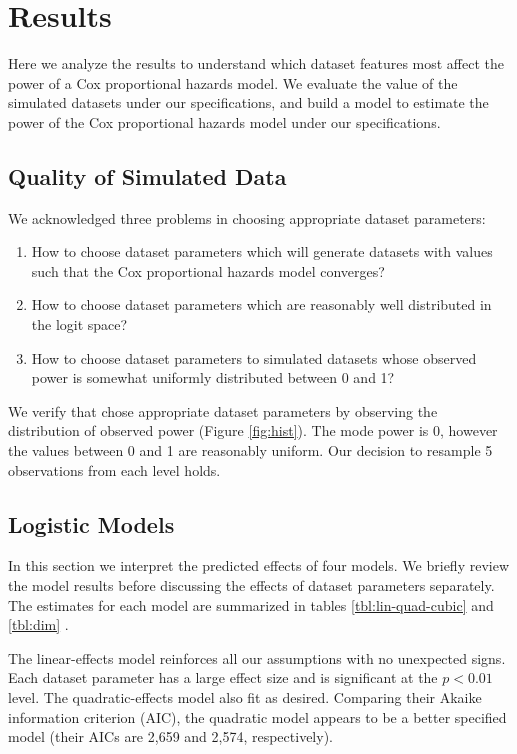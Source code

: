 \section{Results}

Here we analyze the results to understand which dataset features most affect the power of a Cox proportional hazards model. We evaluate the value of the simulated datasets under our specifications, and build a model to estimate the power of the Cox proportional hazards model under our specifications. 

\subsection{Quality of Simulated Data}

We acknowledged three problems in choosing appropriate dataset parameters:

\begin{enumerate}
    \item How to choose dataset parameters which will generate datasets with values such that the Cox proportional hazards model converges?
    \item How to choose dataset parameters which are reasonably well distributed in the logit space? 
    \item How to choose dataset parameters to simulated datasets whose observed power is somewhat uniformly distributed between 0 and 1?
\end{enumerate}



We verify that chose appropriate dataset parameters by observing the distribution of observed power (Figure \ref{fig:hist}). The mode power is 0, however the values between 0 and 1 are reasonably uniform. Our decision to resample 5 observations from each level holds. 

\subsection{Logistic Models}

In this section we interpret the predicted effects of four models. We briefly review the model results before discussing the effects of dataset parameters separately. The estimates for each model are summarized in tables \ref{tbl:lin-quad-cubic} and \ref{tbl:dim}  \cite{stargazer}. 

The linear-effects model reinforces all our assumptions with no unexpected signs. Each dataset parameter has a large effect size and is significant at the $p < 0.01$ level. The quadratic-effects model also fit as desired. Comparing their Akaike information criterion (AIC), the quadratic model appears to be a better specified model (their AICs are 2,659 and 2,574, respectively). 

